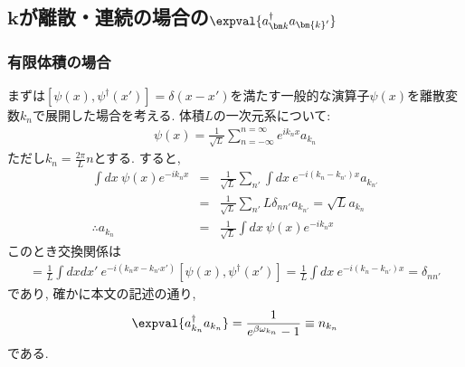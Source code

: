 \documentclass[10.5pt,a4paper]{jreport}
\begin{document}
\subsection{$\bm{k}$が離散・連続の場合の$\expval{a_{\bm k}^\dagger a_{\bm{k}'}}$}
\subsubsection{有限体積の場合}
まずは$\left[\psi(x), \psi^\dagger(x')\right] = \delta(x - x')$を満たす一般的な演算子$\psi(x)$を離散変数$k_n$で展開した場合を考える. 体積$L$の一次元系について:
\begin{eqnarray}
  \psi(x) = \frac{1}{\sqrt{L}}\sum_{n=-\infty}^{n=\infty}e^{ik_nx}a_{k_n}
\end{eqnarray}
ただし$k_n = \frac{2\pi}{L}n$とする. すると,
\begin{eqnarray}
  \int dx\ \psi(x)e^{-ik_nx} &=& \frac{1}{\sqrt{L}}\sum_{n'}\int dx\ e^{-i(k_n-k_{n'})x}a_{k_{n'}}\\
  &=& \frac{1}{\sqrt{L}}\sum_{n'}L\delta_{nn'}a_{k_{n'}} = \sqrt{L}a_{k_n}\\
  \therefore a_{k_n} &=& \frac{1}{\sqrt{L}}\int dx\ \psi(x)e^{-ik_nx}  
\end{eqnarray}
このとき交換関係は
\begin{eqnarray}
  [a_{k_n}, a^\dagger_{k_{n'}}] = \frac{1}{L}\int dx dx'\ e^{-i(k_nx - k_{n'}x')}\left[\psi(x), \psi^\dagger(x')\right] = \frac{1}{L}\int dx \ e^{-i(k_n - k_{n'})x} = \delta_{nn'}
\end{eqnarray}
であり, 確かに本文の記述の通り,
\begin{eqnarray}
  \expval{a_{k_n}^\dagger a_{k_n}} = \frac{1}{e^{\beta\omega_{k_n}}-1} \equiv n_{k_n}
\end{eqnarray}
である.
\end{document}
